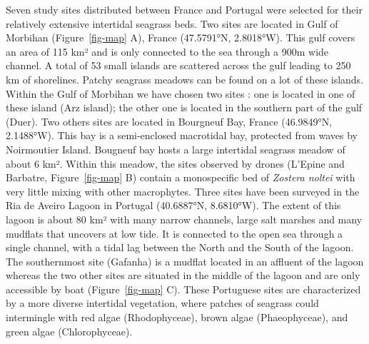 \documentclass[
  number]{elsarticle}
\begin{document}
Seven study sites distributed between France and Portugal were selected
for their relatively extensive intertidal seagrass beds. Two sites are
located in Gulf of Morbihan (Figure~\ref{fig-map} A), France (47.5791°N,
2.8018°W). This gulf covers an area of 115 km² and is only connected to
the sea through a 900m wide channel. A total of 53 small islands are
scattered across the gulf leading to 250 km of shorelines. Patchy
seagrass meadows can be found on a lot of these islands. Within the Gulf
of Morbihan we have chosen two sites : one is located in one of these
island (Arz island); the other one is located in the southern part of
the gulf (Duer). Two others sites are located in Bourgneuf Bay, France
(46.9849°N, 2.1488°W). This bay is a semi-enclosed macrotidal bay,
protected from waves by Noirmoutier Island. Bougneuf bay hosts a large
intertidal seagrass meadow of about 6 km². Within this meadow, the sites
observed by drones (L'Epine and Barbatre, Figure~\ref{fig-map} B)
contain a monospecific bed of \emph{Zostera noltei} with very little
mixing with other macrophytes. Three sites have been surveyed in the Ria
de Aveiro Lagoon in Portugal (40.6887°N, 8.6810°W). The extent of this
lagoon is about 80 km² with many narrow channels, large salt marshes and
many mudflats that uncovers at low tide. It is connected to the open sea
through a single channel, with a tidal lag between the North and the
South of the lagoon. The southernmost site (Gafanha) is a mudflat
located in an affluent of the lagoon whereas the two other sites are
situated in the middle of the lagoon and are only accessible by boat
(Figure~\ref{fig-map} C). These Portuguese sites are characterized by a
more diverse intertidal vegetation, where patches of seagrass could
intermingle with red algae (Rhodophyceae), brown algae (Phaeophyceae),
and green algae (Chlorophyceae).
\end{document}
